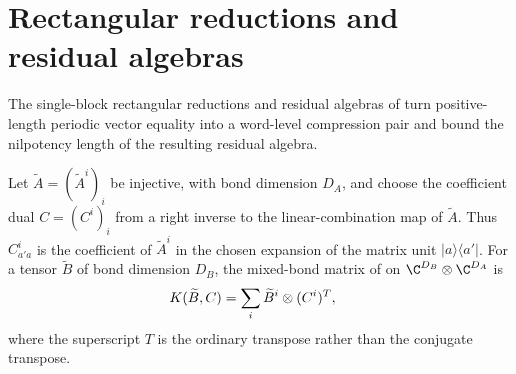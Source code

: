\section{Rectangular reductions and residual algebras}%
\label{sec:asym_reductions}

The single-block rectangular reductions and residual algebras of
\cite[Propositions~20 and~21]{Molnar2018SemiInjective} turn positive-length
periodic vector equality into a word-level compression pair and bound the
nilpotency length of the resulting residual algebra.

\begin{definition}
    \label{def:mps_reduction_cross_matrix}
    \leanok
    Let $\widetilde A=(\widetilde A^i)_i$ be injective, with bond dimension
    $D_A$, and choose the coefficient dual $C=(C^i)_i$ from a right inverse
    to the linear-combination map of $\widetilde A$.  Thus
    $C^i_{a'a}$ is the coefficient of $\widetilde A^i$ in the chosen
    expansion of the matrix unit $\lvert a\rangle\!\langle a'\rvert$.
    For a tensor $\widetilde B$ of bond dimension $D_B$, the mixed-bond
    matrix of \cite[proof of Proposition~20, lines~3817--3838]{Molnar2018SemiInjective}
    on $\C^{D_B}\otimes\C^{D_A}$ is
    \begin{align}
        K(\widetilde B,C)
         & =\sum_i \widetilde B^i\otimes(C^i)^T,
        \notag
    \end{align}
    where the superscript $T$ is the ordinary transpose rather than the
    conjugate transpose.
\end{definition}

